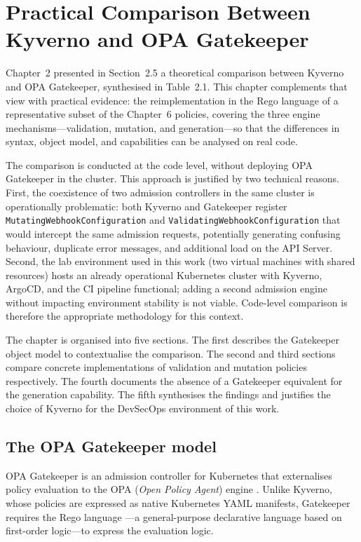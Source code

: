 \chapter{Practical Comparison Between Kyverno and OPA Gatekeeper}

Chapter~2 presented in Section~2.5 a theoretical comparison between Kyverno and OPA Gatekeeper, synthesised in Table~2.1. This chapter complements that view with practical evidence: the reimplementation in the Rego language \cite{rego_docs} of a representative subset of the Chapter~6 policies, covering the three engine mechanisms---validation, mutation, and generation---so that the differences in syntax, object model, and capabilities can be analysed on real code.

The comparison is conducted at the code level, without deploying OPA Gatekeeper in the cluster. This approach is justified by two technical reasons. First, the coexistence of two admission controllers in the same cluster is operationally problematic: both Kyverno and Gatekeeper register \texttt{MutatingWebhookConfiguration} and \texttt{ValidatingWebhookConfiguration} that would intercept the same admission requests, potentially generating confusing behaviour, duplicate error messages, and additional load on the API Server. Second, the lab environment used in this work (two virtual machines with shared resources) hosts an already operational Kubernetes cluster with Kyverno, ArgoCD, and the CI pipeline functional; adding a second admission engine without impacting environment stability is not viable. Code-level comparison is therefore the appropriate methodology for this context.

The chapter is organised into five sections. The first describes the Gatekeeper object model to contextualise the comparison. The second and third sections compare concrete implementations of validation and mutation policies respectively. The fourth documents the absence of a Gatekeeper equivalent for the generation capability. The fifth synthesises the findings and justifies the choice of Kyverno for the DevSecOps environment of this work.

\section{The OPA Gatekeeper model}

OPA Gatekeeper \cite{gatekeeper_docs} is an admission controller for Kubernetes that externalises policy evaluation to the OPA (\textit{Open Policy Agent}) engine \cite{opa_docs}. Unlike Kyverno, whose policies are expressed as native Kubernetes YAML manifests, Gatekeeper requires the Rego language \cite{rego_docs}---a general-purpose declarative language based on first-order logic---to express the evaluation logic.

